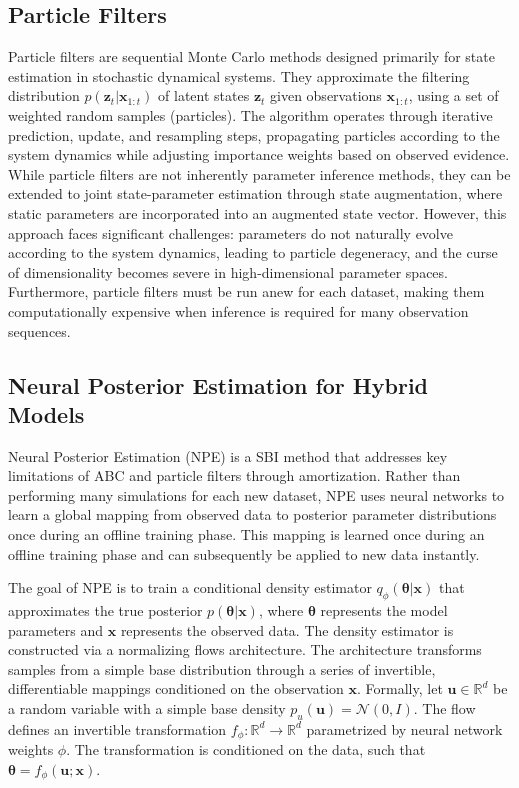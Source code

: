 \documentclass{article}
\begin{document}
\subsection{Particle Filters} 
Particle filters \cite{Arulampalam2002PF, Kitagawa1996PF} are sequential Monte Carlo methods designed primarily for state estimation in stochastic dynamical systems. They approximate the filtering distribution $p(\mathbf{z}_t | \mathbf{x}_{1:t})$ of latent states $\mathbf{z}_t$ given observations $\mathbf{x}_{1:t}$, using a set of weighted random samples (particles). The algorithm operates through iterative prediction, update, and resampling steps, propagating particles according to the system dynamics while adjusting importance weights based on observed evidence. While particle filters are not inherently parameter inference methods, they can be extended to joint state-parameter estimation through state augmentation, where static parameters are incorporated into an augmented state vector. However, this approach faces significant challenges: parameters do not naturally evolve according to the system dynamics, leading to particle degeneracy, and the curse of dimensionality becomes severe in high-dimensional parameter spaces. Furthermore, particle filters must be run anew for each dataset, making them computationally expensive when inference is required for many observation sequences.


\subsection{Neural Posterior Estimation for Hybrid Models}

Neural Posterior Estimation (NPE) is a SBI method that addresses key limitations of ABC and particle filters through amortization. Rather than performing many simulations for each new dataset, NPE uses neural networks to learn a global mapping from observed data to posterior parameter distributions once during an offline training phase. This mapping is learned once during an offline training phase and can subsequently be applied to new data instantly.


The goal of NPE is to train a conditional density estimator $q_\phi(\boldsymbol{\theta} | \mathbf{x})$ that approximates the true posterior $p(\boldsymbol{\theta} | \mathbf{x})$, where $\boldsymbol{\theta}$ represents the model parameters and $\mathbf{x}$ represents the observed data. The density estimator is constructed via a normalizing flows architecture. The architecture transforms samples from a simple base distribution through a series of invertible, differentiable mappings conditioned on the observation $\mathbf{x}$. Formally, let $\mathbf{u} \in \mathbb{R}^d$ be a random variable with a simple base density $p_u(\mathbf{u}) = \mathcal{N}(0, I)$. The flow defines an invertible transformation $f_\phi: \mathbb{R}^d \rightarrow \mathbb{R}^d$ parametrized by neural network weights $\phi$. The transformation is conditioned on the data, such that $\boldsymbol{\theta} = f_\phi(\mathbf{u}; \mathbf{x})$.
\end{document}
